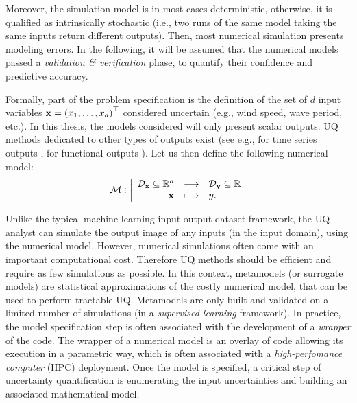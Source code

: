 Moreover, the simulation model is in most cases deterministic, otherwise, it is qualified as intrinsically stochastic (i.e., two runs of the same model taking the same inputs return different outputs).
Then, most numerical simulation presents modeling errors. 
In the following, it will be assumed that the numerical models passed a \textit{validation \& verification} phase, to quantify their confidence and predictive accuracy. 

Formally, part of the problem specification is the definition of the set of $d$ input variables ${\bf x} = \left(x_1, \dots, x_d\right)^\top$ considered uncertain (e.g., wind speed, wave period, etc.). 
In this thesis, the models considered will only present scalar outputs. 
UQ methods dedicated to other types of outputs exist (see e.g., for time series outputs \citet{lataniotis_2019}, for functional outputs \citet{auder_2012,rollon_2021}). 
Let us then define the following numerical model:
\begin{equation}
\mathcal{M} : \bigg|
    \begin{array}{rcl}
        \mathcal{D}_{{\bf x}} \subseteq \mathbb{R}^d & \longrightarrow & \mathcal{D}_{{\bf y}} \subseteq \mathbb{R} \\
        {\bf x} & \longmapsto & y.
    \end{array}
\end{equation}

Unlike the typical machine learning input-output dataset framework, the UQ analyst can simulate the output image of any inputs (in the input domain), using the numerical model. 
However, numerical simulations often come with an important computational cost. 
Therefore UQ methods should be efficient and require as few simulations as possible. 
In this context, metamodels (or surrogate models) are statistical approximations of the costly numerical model, that can be used to perform tractable UQ. 
Metamodels are only built and validated on a limited number of simulations (in a \textit{supervised learning} framework).
In practice, the model specification step is often associated with the development of a \textit{wrapper} of the code. 
The wrapper of a numerical model is an overlay of code allowing its execution in a parametric way, which is often associated with a \textit{high-perfomance computer} (HPC) deployment.  
Once the model is specified, a critical step of uncertainty quantification is enumerating the input uncertainties and building an associated mathematical model.


